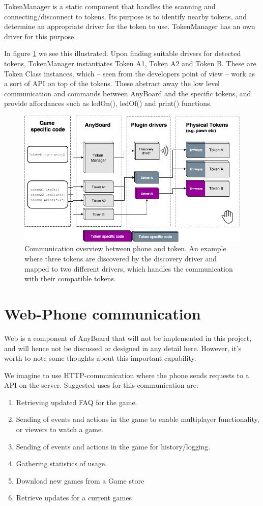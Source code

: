 TokenManager is a static component that handles the scanning and connecting/disconnect to tokens.
Its purpose is to identify nearby tokens, and determine an appropriate driver for the token to use. TokenManager has an own driver for this purpose. 

In figure \ref{fig:anypawn_architecture} we see this illustrated. Upon finding suitable drivers for detected tokens, TokenManager instantiates Token A1, Token A2 and Token B. These are Token Class instances, which – seen from the developers point of view – work as a sort of API on top of the tokens. These abstract away the low level communication and commands between AnyBoard and the specific tokens, and provide affordances such as ledOn(), ledOf() and print() functions.

\begin{figure}[ht]
\includegraphics[width=12cm]{img/design_tokenmanager}
\centering
\caption{Communication overview between phone and token. An example where three tokens are discovered by the discovery driver and mapped to two different drivers, which handles the communication with their compatible tokens.}
\label{fig:anypawn_architecture}
\end{figure}


\section{Web-Phone communication}
Web is a component of AnyBoard that will not be implemented in this project, and will hence not be discussed or designed in any detail here. However, it's worth to note some thoughts about this important capability.

We imagine to use HTTP-communication where the phone sends requests to a API on the server. Suggested uses for this communication are:
\begin{enumerate}
\item Retrieving updated FAQ for the game.
\item Sending of events and actions in the game to enable multiplayer functionality, or viewers to watch a game.
\item Sending of events and actions in the game for history/logging.
\item Gathering statistics of usage.
\item Download new games from a Game store
\item Retrieve updates for a current games
\end{enumerate}

